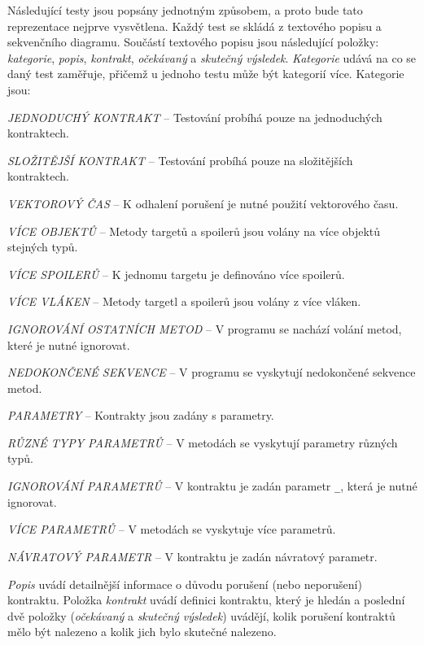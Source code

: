 Následující testy jsou popsány jednotným způsobem, a proto bude tato reprezentace nejprve vysvětlena. Každý test se skládá z textového popisu a sekvenčního diagramu. Součástí textového popisu jsou následující položky:
\textit{kategorie}, \textit{popis}, \textit{kontrakt}, \textit{očekávaný} a \textit{skutečný výsledek}. \textit{Kategorie} udává na co se daný test zaměřuje, přičemž u jednoho testu může být kategorií více. Kategorie jsou:

\begin{description}
\item{\textit{JEDNODUCHÝ KONTRAKT} -- Testování probíhá pouze na jednoduchých kontraktech.}
\item{\textit{SLOŽITĚJŠÍ KONTRAKT} -- Testování probíhá pouze na složitějších kontraktech.}
\item{\textit{VEKTOROVÝ ČAS} -- K odhalení porušení je nutné použití vektorového času.}
\item{\textit{VÍCE OBJEKTŮ} -- Metody targetů a spoilerů jsou volány na více objektů stejných typů.}
\item{\textit{VÍCE SPOILERŮ} -- K jednomu targetu je definováno více spoilerů.}
\item{\textit{VÍCE VLÁKEN} -- Metody targetl a spoilerů jsou volány z více vláken.}
\item{\textit{IGNOROVÁNÍ OSTATNÍCH METOD} -- V programu se nachází volání metod, které je nutné ignorovat.}
\item{\textit{NEDOKONČENÉ SEKVENCE} -- V programu se vyskytují nedokončené sekvence metod.}
\item{\textit{PARAMETRY} -- Kontrakty jsou zadány s parametry.}
\item{\textit{RŮZNÉ TYPY PARAMETRŮ} -- V metodách se vyskytují parametry různých typů.}
\item{\textit{IGNOROVÁNÍ PARAMETRŮ} -- V kontraktu je zadán parametr \texttt{\_}, která je nutné ignorovat.}
\item{\textit{VÍCE PARAMETRŮ} -- V metodách se vyskytuje více parametrů.}
\item{\textit{NÁVRATOVÝ PARAMETR} -- V kontraktu je zadán návratový parametr.}
\end{description}

\textit{Popis} uvádí detailnější informace o důvodu porušení (nebo neporušení) kontraktu. Položka \textit{kontrakt} uvádí definici kontraktu, který je hledán a poslední dvě položky (\textit{očekávaný} a \textit{skutečný výsledek}) uvádějí, kolik porušení kontraktů mělo být nalezeno a kolik jich bylo skutečné nalezeno.

